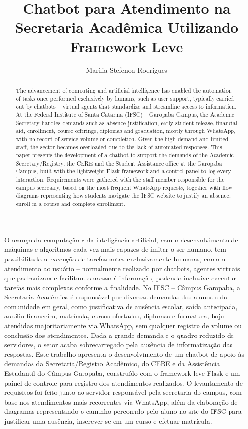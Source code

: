 \documentclass[10pt]{article}
\title{Chatbot para Atendimento na Secretaria Acadêmica Utilizando Framework Leve}
\author{Marília Stefenon Rodrigues\inst{1}}
\begin{document}
\maketitle

\begin{abstract}
The advancement of computing and artificial intelligence has enabled the
automation of tasks once performed exclusively by humans, such as user
support, typically carried out by chatbots -- virtual agents that
standardize and streamline access to information. At the Federal
Institute of Santa Catarina (IFSC) -- Garopaba Campus, the Academic
Secretary handles demands such as absence justification, early student
release, financial aid, enrollment, course offerings, diplomas and
graduation, mostly through WhatsApp, with no record of service volume or
completion. Given the high demand and limited staff, the sector becomes
overloaded due to the lack of automated responses. This paper presents
the development of a chatbot to support the demands of the Academic
Secretary/Registry, the CERE and the Student Assistance office at the
Garopaba Campus, built with the lightweight Flask framework and a
control panel to log every interaction. Requirements were gathered with the staff member
responsible for the campus secretary, based on the most frequent
WhatsApp requests, together with flow diagrams representing how students
navigate the IFSC website to justify an absence, enroll in a course and
complete enrollment.
\end{abstract}

\begin{resumo}
O avanço da computação e da inteligência artificial, com o
desenvolvimento de máquinas e algoritmos cada vez mais capazes de imitar
o ser humano, tem possibilitado a execução de tarefas antes
exclusivamente humanas, como o atendimento ao usuário -- normalmente
realizado por chatbots, agentes virtuais que padronizam e facilitam o
acesso à informação, podendo inclusive executar tarefas mais complexas
conforme a finalidade. No IFSC -- Câmpus Garopaba, a Secretaria
Acadêmica é responsável por diversas demandas dos alunos e da comunidade
em geral, como justificativa de ausência escolar, saída antecipada,
auxílio financeiro, matrícula, cursos ofertados, diplomas e formatura,
hoje atendidas majoritariamente via WhatsApp, sem qualquer registro de
volume ou conclusão dos atendimentos. Dada a grande demanda e o quadro
reduzido de servidores, o setor acaba sobrecarregado pela ausência de
informatização das respostas. Este trabalho apresenta o desenvolvimento
de um chatbot de apoio às demandas da Secretaria/Registro Acadêmico, do
CERE e da Assistência Estudantil do Câmpus Garopaba, construído com o
framework leve Flask e um
painel de controle para registro dos atendimentos realizados. O
levantamento de requisitos foi feito junto ao servidor responsável pela
secretaria do campus, com base nos atendimentos mais recorrentes via
WhatsApp, além da elaboração de diagramas representando o caminho
percorrido pelo aluno no site do IFSC para justificar uma ausência,
inscrever-se em um curso e efetuar matrícula.
\end{resumo}
\end{document}
